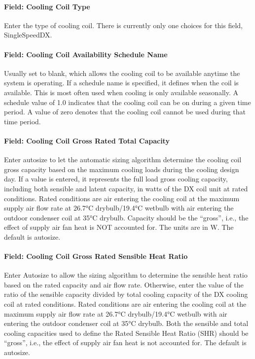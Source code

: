 \paragraph{Field: Cooling Coil Type}\label{field-cooling-coil-type-1}

Enter the type of cooling coil. There is currently only one choices for this field, SingleSpeedDX.

\paragraph{Field: Cooling Coil Availability Schedule Name}\label{field-cooling-coil-availability-schedule-name-1}

Usually set to blank, which allows the cooling coil to be available anytime the system is operating. If a schedule name is specified, it defines when the coil is available. This is most often used when cooling is only available seasonally. A schedule value of 1.0 indicates that the cooling coil can be on during a given time period. A value of zero denotes that the cooling coil cannot be used during that time period.

\paragraph{Field: Cooling Coil Gross Rated Total Capacity}\label{field-cooling-coil-gross-rated-total-capacity}

Enter autosize to let the automatic sizing algorithm determine the cooling coil gross capacity based on the maximum cooling loads during the cooling design day. If a value is entered, it represents the full load gross cooling capacity, including both sensible and latent capacity, in watts of the DX coil unit at rated conditions. Rated conditions are air entering the cooling coil at the maximum supply air flow rate at 26.7°C drybulb/19.4°C wetbulb with air entering the outdoor condenser coil at 35°C drybulb. Capacity should be the ``gross'', i.e., the effect of supply air fan heat is NOT accounted for. The units are in W. The default is autosize.

\paragraph{Field: Cooling Coil Gross Rated Sensible Heat Ratio}\label{field-cooling-coil-gross-rated-sensible-heat-ratio}

Enter Autosize to allow the sizing algorithm to determine the sensible heat ratio based on the rated capacity and air flow rate. Otherwise, enter the value of the ratio of the sensible capacity divided by total cooling capacity of the DX cooling coil at rated conditions. Rated conditions are air entering the cooling coil at the maximum supply air flow rate at 26.7°C drybulb/19.4°C wetbulb with air entering the outdoor condenser coil at 35°C drybulb. Both the sensible and total cooling capacities used to define the Rated Sensible Heat Ratio (SHR) should be ``gross'', i.e., the effect of supply air fan heat is not accounted for. The default is autosize.

